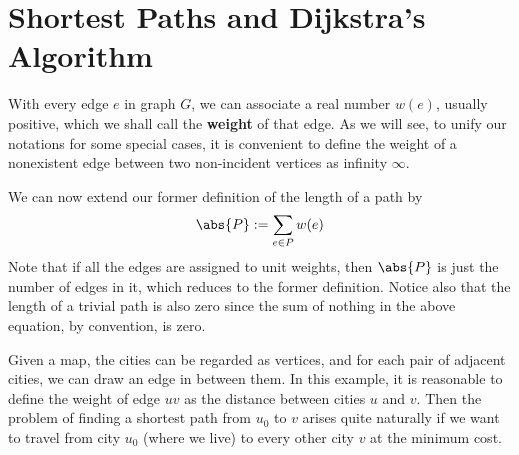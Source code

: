 \documentclass[thmcnt=section, 12pt, color=cyan]{my-elegantbook}
\begin{document}

\section{Shortest Paths and Dijkstra's Algorithm}

With every edge $e$ in graph $G$, we can associate a real number $w(e)$, usually positive, which we shall call the \textbf{weight} of that edge. As we will see, to unify our notations for some special cases, it is convenient to define the weight of a nonexistent edge between two non-incident vertices as infinity $\infty$. 

We can now extend our former definition of the length of a path by 
\begin{align*}
    \abs{P} := \sum_{e \in P} w(e)
\end{align*}
Note that if all the edges are assigned to unit weights, then $\abs{P}$ is just the number of edges in it, which reduces to the former definition. Notice also that the length of a trivial path is also zero since the sum of nothing in the above equation, by convention, is zero.

Given a map, the cities can be regarded as vertices, and for each pair of adjacent cities, we can draw an edge in between them. In this example, it is reasonable to define the weight of edge $uv$ as the distance between cities $u$ and $v$. Then the problem of finding a shortest path from $u_0$ to $v$ arises quite naturally if we want to travel from city $u_0$ (where we live) to every other city $v$ at the minimum cost.
\end{document}
